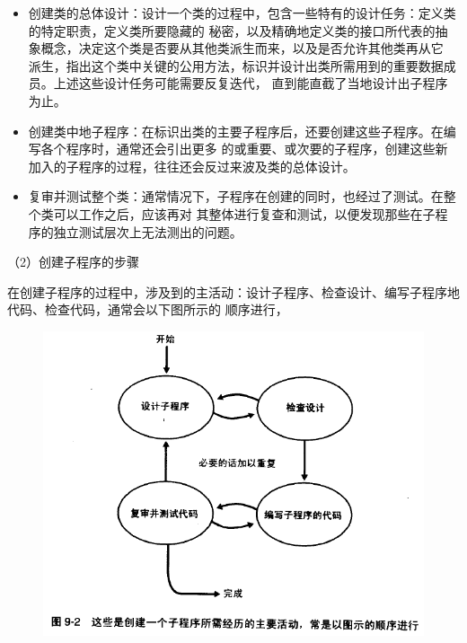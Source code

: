 \documentclass{article}
\begin{document}
\begin{itemize}
    \item 创建类的总体设计：设计一个类的过程中，包含一些特有的设计任务：定义类的特定职责，定义类所要隐藏的
    秘密，以及精确地定义类的接口所代表的抽象概念，决定这个类是否要从其他类派生而来，以及是否允许其他类再从它
    派生，指出这个类中关键的公用方法，标识并设计出类所需用到的重要数据成员。上述这些设计任务可能需要反复迭代，
    直到能直截了当地设计出子程序为止。
    \item 创建类中地子程序：在标识出类的主要子程序后，还要创建这些子程序。在编写各个程序时，通常还会引出更多
    的或重要、或次要的子程序，创建这些新加入的子程序的过程，往往还会反过来波及类的总体设计。
    \item 复审并测试整个类：通常情况下，子程序在创建的同时，也经过了测试。在整个类可以工作之后，应该再对
    其整体进行复查和测试，以便发现那些在子程序的独立测试层次上无法测出的问题。
\end{itemize}

\par
（2）创建子程序的步骤
\par
在创建子程序的过程中，涉及到的主活动：设计子程序、检查设计、编写子程序地代码、检查代码，通常会以下图所示的
顺序进行，
\begin{figure}[htb]
    \centering
    \includegraphics[width=15cm]{figure13.PNG}
\end{figure}
\end{document}
